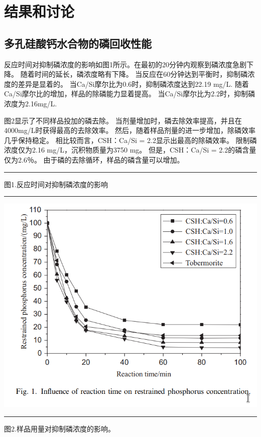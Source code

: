 \documentclass[11pt]{article}
\begin{document}
\section{结果和讨论}
\label{sec:org09e0eeb}
\subsection{多孔硅酸钙水合物的磷回收性能}
\label{sec:org7a375db}
反应时间对抑制磷浓度的影响如图1所示。在最初的20分钟内观察到磷浓度急剧下降。 随着时间的延长，磷浓度略有下降。 当反应在60分钟达到平衡时，抑制磷浓度的差异是显着的。 当Ca/Si摩尔比为0.6时，抑制磷浓度达到22.19 mg/L. 随着Ca/Si摩尔比的增加，样品的除磷能力显着提高。 当Ca/Si摩尔比为2.2时，抑制磷浓度为2.16mg/L.

图2显示了不同样品投加的磷去除。 当剂量增加时，磷去除效率提高，并且在4000mg/L时获得最高的去除效率。 然后，随着样品剂量的进一步增加，除磷效率几乎保持稳定。 相比较而言，CSH：Ca/Si = 2.2显示出最高的除磷效率。 限制磷浓度仅为2.16 mg/L，沉积物质量为3750 mg。 但是，CSH：Ca/Si = 2.2的磷含量仅为2.6％。 由于磷的去除循环，样品的磷含量可以增加。

\noindent\rule{\textwidth}{0.5pt}
图1.反应时间对抑制磷浓度的影响

\noindent\rule{\textwidth}{0.5pt}
\includegraphics[scale=0.3]{fig.1.png}

\noindent\rule{\textwidth}{0.5pt}
图2.样品用量对抑制磷浓度的影响。
\end{document}
